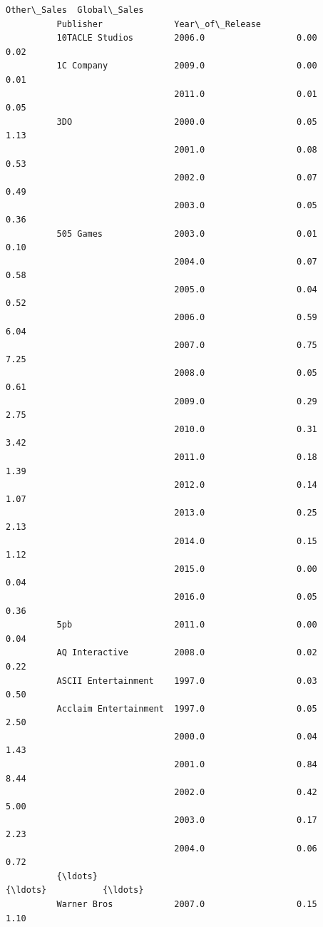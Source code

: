 \documentclass[11pt]{article}
\begin{document}
\begin{Verbatim}[commandchars=\\\{\}]
                                                  Other\_Sales  Global\_Sales  
          Publisher              Year\_of\_Release                             
          10TACLE Studios        2006.0                  0.00          0.02  
          1C Company             2009.0                  0.00          0.01  
                                 2011.0                  0.01          0.05  
          3DO                    2000.0                  0.05          1.13  
                                 2001.0                  0.08          0.53  
                                 2002.0                  0.07          0.49  
                                 2003.0                  0.05          0.36  
          505 Games              2003.0                  0.01          0.10  
                                 2004.0                  0.07          0.58  
                                 2005.0                  0.04          0.52  
                                 2006.0                  0.59          6.04  
                                 2007.0                  0.75          7.25  
                                 2008.0                  0.05          0.61  
                                 2009.0                  0.29          2.75  
                                 2010.0                  0.31          3.42  
                                 2011.0                  0.18          1.39  
                                 2012.0                  0.14          1.07  
                                 2013.0                  0.25          2.13  
                                 2014.0                  0.15          1.12  
                                 2015.0                  0.00          0.04  
                                 2016.0                  0.05          0.36  
          5pb                    2011.0                  0.00          0.04  
          AQ Interactive         2008.0                  0.02          0.22  
          ASCII Entertainment    1997.0                  0.03          0.50  
          Acclaim Entertainment  1997.0                  0.05          2.50  
                                 2000.0                  0.04          1.43  
                                 2001.0                  0.84          8.44  
                                 2002.0                  0.42          5.00  
                                 2003.0                  0.17          2.23  
                                 2004.0                  0.06          0.72  
          {\ldots}                                             {\ldots}           {\ldots}  
          Warner Bros            2007.0                  0.15          1.10  

\end{Verbatim}
\end{document}
